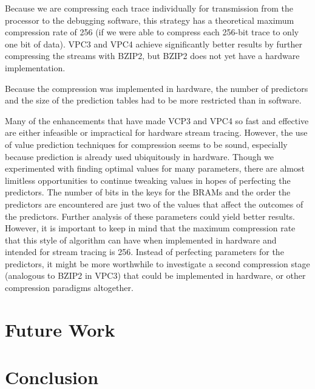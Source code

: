 \documentclass[conference]{IEEEtran}
\begin{document}
Because we are compressing each trace individually for transmission from the processor to the debugging software, this strategy has a theoretical maximum compression rate of 256 (if we were able to compress each 256-bit trace to only one bit of data). VPC3 and VPC4 achieve significantly better results by further compressing the streams with BZIP2, but BZIP2 does not yet have a hardware implementation. %

Because the compression was implemented in hardware, the number of predictors and the size of the prediction tables had to be more restricted than in software. %

Many of the enhancements that have made VCP3 and VPC4 so fast and effective are either infeasible or impractical for hardware stream tracing. However, the use of value prediction techniques for compression seems to be sound, especially because prediction is already used ubiquitously in hardware. 
Though we experimented with finding optimal values for many parameters, there are almost limitless opportunities to continue tweaking values in hopes of perfecting the predictors. The number of bits in the keys for the BRAMs and the order the predictors are encountered are just two of the values that affect the outcomes of the predictors. Further analysis of these parameters could yield better results. However, it is important to keep in mind that the maximum compression rate that this style of algorithm can have when implemented in hardware and intended for stream tracing is 256. Instead of perfecting parameters for the predictors, it might be more worthwhile to investigate a second compression stage (analogous to BZIP2 in VPC3) that could be implemented in hardware, or other compression paradigms altogether. 


\section{Future Work}


\section{Conclusion}






\end{document}
